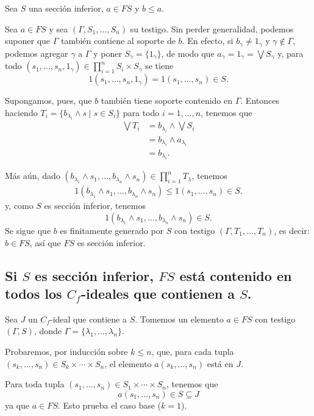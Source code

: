\documentclass[12pt,letterpaper,titlepage]{article}
\theoremstyle{definition}
\newcommand\Sup{\bigvee}
\renewcommand\inf{\wedge}
\newcommand\tps[2]{\texorpdfstring{#1}{#2}}
\newcommand\<{\langle}
\renewcommand\>{\rangle}
\begin{document}
Sea $S$ una sección inferior, $a\in FS$ y $b\leq a$.

Sea $a\in FS$ y sea $(\Gamma,S_1,\dots,S_n)$ su testigo.
Sin perder generalidad, podemos suponer que $\Gamma$ también
contiene al soporte de $b$.
En efecto, si $b_\gamma\neq 1_\gamma$ y $\gamma\not\in\Gamma$,
podemos agregar $\gamma$ a $\Gamma$ y poner
$S_\gamma = \{1_\gamma\}$,
de modo que $a_\gamma = 1_\gamma = \Sup S_\gamma$
y, para todo
$(s_1,\dots,s_n,1_\gamma)\in\prod_{i=1}^nS_i\times S_\gamma$
se tiene
\[
  1(s_1,\dots,s_n,1_\gamma) = 1(s_1,\dots,s_n) \in S
.\]

Supongamos, pues, que $b$ también tiene soporte contenido en
$\Gamma$.
Entonces haciendo $T_i=\{b_{\lambda_i}\inf s \mid s\in S_i\}$
para todo $i=1,\dots,n$, tenemos que
\begin{align*}
  \Sup T_i
  &= b_{\lambda_i}\inf\Sup S_i \\
  &= b_{\lambda_i}\inf a_{\lambda_i} \\
  &= b_{\lambda_i}.
\end{align*}

Más aún, dado $(b_{\lambda_1}\inf s_1,\dots,b_{\lambda_n}\inf
s_n)\in \prod_{i=1}^n T_\lambda$, tenemos
\begin{align*}
  1(b_{\lambda_1}\inf s_1,\dots,b_{\lambda_n}\inf s_n)
  \leq 1(s_1,\dots,s_n) \in S.
\end{align*}
y, como $S$ es sección inferior, tenemos
\[
  1(b_{\lambda_1}\inf s_1,\dots,b_{\lambda_n}\inf s_n) \in S
.\]
Se sigue que $b$ es finitamente generado por $S$ con testigo
$(\Gamma,T_1,\dots,T_n)$, es decir: $b\in FS$,
así que $FS$ es sección inferior.

\subsection{Si \tps{$S$}{S} es sección inferior, \tps{$FS$}{FS} está contenido en todos los \tps{$C_f$}{Cf}-ideales que contienen a \tps{$S$}{S}.}

Sea $J$ un $C_f$-ideal que contiene a $S$.
Tomemos un elemento $a\in FS$ con testigo $(\Gamma,S)$, donde
$\Gamma=\{\lambda_1,\dots,\lambda_n\}$.

Probaremos, por inducción sobre $k\leq n$, que, para cada tupla
$(s_k,\dots,s_n)\in S_k\times\cdots\times S_n$, el elemento
$a(s_k,\dots,s_n)$ está en $J$.

Para toda tupla
$(s_1,\dots,s_n)\in S_1\times\cdots\times S_n$, tenemos que
\[
  a(s_1,\dots,s_n)\in S\subseteq J
\]
ya que $a\in FS$.
Esto prueba el caso base ($k=1$).
\end{document}
